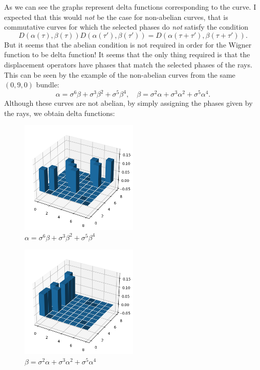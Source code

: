 \documentclass[a4paper]{article}
\begin{document}
  As we can see the graphs represent delta functions
  corresponding to the curve. I expected that this would
  \textit{not} be the case for non-abelian curves, that is
  commutative curves for which the selected phases do
  \textit{not} satisfy the condition
  \begin{equation}
    D(\alpha(\tau),\beta(\tau))
    D(\alpha(\tau'),\beta(\tau'))
    = D(\alpha(\tau+\tau'),\beta(\tau+\tau')).
  \end{equation}
  But it seems that the abelian condition is not required
  in order for the Wigner function to be delta function!
  It seems that the only thing required is that the
  displacement operators have phases that match the selected
  phases of the rays. This can be seen by the example of the
  non-abelian curves from the same $(0,9,0)$ bundle:
  \begin{equation}
    \alpha = \sigma^6 \beta + \sigma^3 \beta^2 + \sigma^5
    \beta^{4},
    \quad
    \beta = \sigma^2 \alpha + \sigma^3 \alpha^2 + \sigma^5
    \alpha^{4}.
  \end{equation}
  Although these curves are not abelian, by simply assigning
  the phases given by the rays, we obtain delta functions:
  \begin{figure}[ht]
    \centering
    \includegraphics[width=0.5\textwidth]{090-3.png}
    \caption{$\alpha = \sigma^6 \beta + \sigma^3 \beta^2 + \sigma^5
    \beta^{4}$}
    \label{fig:090-3}
  \end{figure}
  \begin{figure}[ht]
    \centering
    \includegraphics[width=0.5\textwidth]{090-4.png}
    \caption{$\beta = \sigma^2 \alpha + \sigma^3 \alpha^2 + \sigma^5
    \alpha^{4}$}
    \label{fig:090-4}
  \end{figure}
\end{document}

